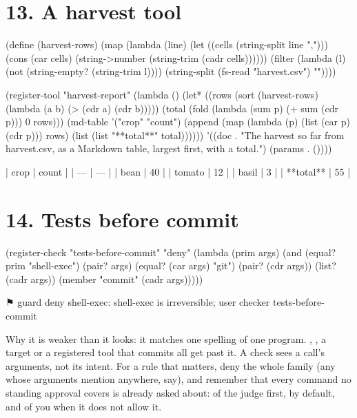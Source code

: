 \section*{13. A harvest tool}

\begin{scm}
(define (harvest-rows)
  (map (lambda (line)
         (let ((cells (string-split line ",")))
           (cons (car cells) (string->number (string-trim (cadr cells))))))
       (filter (lambda (l) (not (string-empty? (string-trim l))))
               (string-split (fs-read "harvest.csv") "\n"))))

(register-tool "harvest-report"
  (lambda ()
    (let* ((rows (sort (harvest-rows) (lambda (a b) (> (cdr a) (cdr b)))))
           (total (fold (lambda (sum p) (+ sum (cdr p))) 0 rows)))
      (md-table '("crop" "count")
                (append (map (lambda (p) (list (car p) (cdr p))) rows)
                        (list (list "**total**" total))))))
  '((doc . "The harvest so far from harvest.csv, as a Markdown table, largest first, with a total.")
    (params . ())))
\end{scm}

\begin{txt}
| crop | count |
| --- | --- |
| bean | 40 |
| tomato | 12 |
| basil | 3 |
| **total** | 55 |
\end{txt}

\section*{14. Tests before commit}

\begin{scm}
(register-check "tests-before-commit" "deny"
  (lambda (prim args)
    (and (equal? prim "shell-exec")
         (pair? args)
         (equal? (car args) "git")
         (pair? (cdr args))
         (list? (cadr args))
         (member "commit" (cadr args)))))
\end{scm}

\begin{txt}
⚑ guard deny shell-exec: shell-exec is irreversible; user checker tests-before-commit
\end{txt}

Why it is weaker than it looks: it matches one spelling of one program.
, , a
 target or a registered tool that commits all get past it. A
check sees a call's arguments, not its intent. For a rule that matters,
deny the whole family (any  whose arguments mention
 anywhere, say), and remember that every command no standing
approval covers is already asked about: of the judge first, by default,
and of you when it does not allow it.

